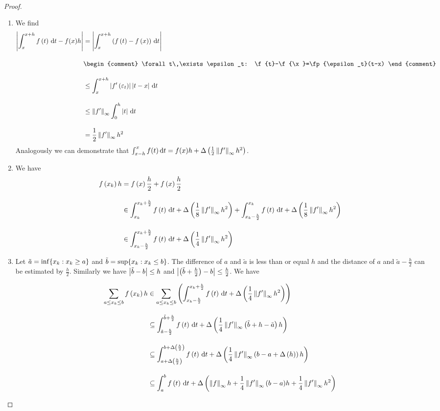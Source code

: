 \begin{proof}~
  \begin{enumerate}
    \item We find
      \begin{align}
        \abs{\int_x^{x+h} \f{t} \d{t} - f(x)h} &= \abs{\int_x^{x+h} \br{\f{t}-\f{x}} \d{t} } \bnl
        &
        \begin{comment}
          \forall t\,\exists \epsilon_t: \f{t}-\f{\x}=\fp{\epsilon_t}(t-x)
        \end{comment} \bnl
        & \le \int_{x}^{x+h} \abs{\fp{\epsilon_t}} \abs{t-x} \d{t} \bnl
        & \le \snorm{f'} \int_{0}^{h} \abs{t} \d{t} \bnl
        & = \frac 12 \snorm{f'} h^2
      \end{align}
      Analogously we can demonstrate that $\int_{x-h}^x f(t) \,\mathrm d{t} = f(x) h + \Delta\left( {\frac 12 \left\|{f'}\right\|_\infty h^2} \right)$.

    \item We have
      \begin{align}
        \f{\x} h & = \f{x} \frac h2 + \f{x} \frac h2 \bnl
        &\in \int_{\x}^{\x+\frac h2} \f{t}\d{t} + \bigabs{\frac 18 \snorm{f'} h^2} + \int_{\x-\frac h2}^{\x} \f{t}\d{t} + \bigabs{\frac 18 \snorm{f'} h^2} \bnl
        &\in \int_{\x-\frac h2}^{\x+\frac h2} \f{t}\d{t} + \bigabs{\frac 14 \snorm{f'} h^2}
      \end{align}

    \item Let $\tilde a = \inf \{ x_{k} : x_{k} \ge a \}$ and $\tilde b = \sup \{ x_{k} : x_{k} \le b \}$. The difference of $a$ and $\tilde a$ is less than or equal $h$ and the distance of $a$ and $\tilde a - \frac h2$ can be estimated by $\frac h2$. Similarly we have $\left|{\tilde b-b}\right| \le h$ and $\left|{\left( {\tilde b+\frac h2} \right)-b}\right| \le \frac h2$. We have

      \begin{align}
        \sum_{a \le \x \le b} \f{\x} h & \in \sum_{a\le \x\le b} \br{\int_{\x-\frac h2}^{\x+\frac h2} \f{t} \d{t} + \bigabs{\frac 14 \snorm{f'} h^2}} \bnl
        & \subseteq \int_{\tilde a - \frac h2}^{\tilde b + \frac h2} \f{t} \d{t} + \bigabs{\frac 14 \snorm{f'}\br{\tilde b + h - \tilde a} h}\bnl
        & \subseteq \int_{a+\bigabs{\frac h2}}^{b+\bigabs{\frac h2}} \f{t} \d{t} + \bigabs{\frac 14\snorm{f'}\br{b-a+\bigabs{h}} h}\bnl
        & \subseteq \int_a^b \f{t} \d{t} + \bigabs{\snorm{f}h + \frac 14 \snorm{f'} (b-a) h + \frac 14 \snorm{f'} h^2}
      \end{align}

  \end{enumerate}
\end{proof}

